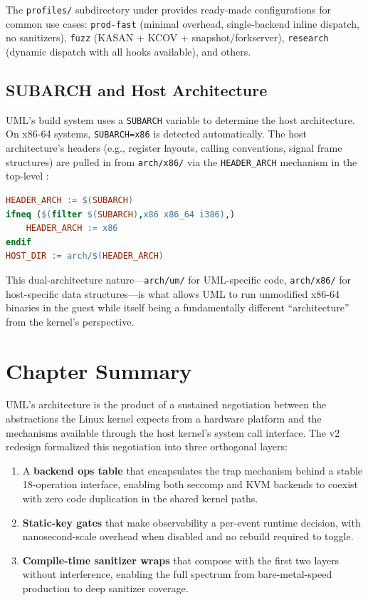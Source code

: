 The \texttt{profiles/} subdirectory under  provides
ready-made configurations for common use cases: \texttt{prod-fast} (minimal
overhead, single-backend inline dispatch, no sanitizers),
\texttt{fuzz} (KASAN + KCOV + snapshot/forkserver), \texttt{research}
(dynamic dispatch with all hooks available), and others.

\subsection{SUBARCH and Host Architecture}

UML's build system uses a \texttt{SUBARCH} variable to determine the host
architecture.  On x86-64 systems, \texttt{SUBARCH=x86} is detected
automatically.  The host architecture's headers (e.g., register layouts,
calling conventions, signal frame structures) are pulled in from
\texttt{arch/x86/} via the \texttt{HEADER\_ARCH} mechanism in the top-level
:

\begin{lstlisting}[language=make, caption={Host architecture header
  selection.}]
HEADER_ARCH := $(SUBARCH)
ifneq ($(filter $(SUBARCH),x86 x86_64 i386),)
    HEADER_ARCH := x86
endif
HOST_DIR := arch/$(HEADER_ARCH)
\end{lstlisting}

This dual-architecture nature---\texttt{arch/um/} for UML-specific code,
\texttt{arch/x86/} for host-specific data structures---is what allows UML to
run unmodified x86-64 binaries in the guest while itself being a fundamentally
different ``architecture'' from the kernel's perspective.


\section{Chapter Summary}
\label{sec:arch-summary}

UML's architecture is the product of a sustained negotiation between the
abstractions the Linux kernel expects from a hardware platform and the
mechanisms available through the host kernel's system call interface.  The v2
redesign formalized this negotiation into three orthogonal layers:

\begin{enumerate}[leftmargin=2em]
\item A \textbf{backend ops table} that encapsulates the trap mechanism behind
  a stable 18-operation interface, enabling both seccomp and KVM backends to
  coexist with zero code duplication in the shared kernel paths.
\item \textbf{Static-key gates} that make observability a per-event runtime
  decision, with nanosecond-scale overhead when disabled and no rebuild
  required to toggle.
\item \textbf{Compile-time sanitizer wraps} that compose with the first two
  layers without interference, enabling the full spectrum from bare-metal-speed
  production to deep sanitizer coverage.
\end{enumerate}

